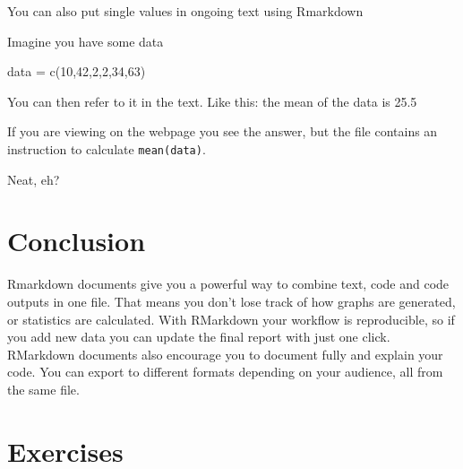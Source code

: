 \documentclass[
]{book}
\newenvironment{Shaded}{\begin{snugshade}}{\end{snugshade}}
\newcommand{\DecValTok}[1]{\textcolor[rgb]{0.00,0.00,0.81}{#1}}
\newcommand{\FunctionTok}[1]{\textcolor[rgb]{0.00,0.00,0.00}{#1}}
\newcommand{\NormalTok}[1]{#1}
\newcommand{\OtherTok}[1]{\textcolor[rgb]{0.56,0.35,0.01}{#1}}
\begin{document}
You can also put single values in ongoing text using Rmarkdown

Imagine you have some data

\begin{Shaded}
\begin{Highlighting}[]
\NormalTok{data }\OtherTok{=} \FunctionTok{c}\NormalTok{(}\DecValTok{10}\NormalTok{,}\DecValTok{42}\NormalTok{,}\DecValTok{2}\NormalTok{,}\DecValTok{2}\NormalTok{,}\DecValTok{34}\NormalTok{,}\DecValTok{63}\NormalTok{)}
\end{Highlighting}
\end{Shaded}

You can then refer to it in the text. Like this: the mean of the data is 25.5

If you are viewing on the webpage you see the answer, but the file contains an instruction to calculate \texttt{mean(data)}.

Neat, eh?

\hypertarget{conclusion}{%
\section{Conclusion}\label{conclusion}}

Rmarkdown documents give you a powerful way to combine text, code and code outputs in one file. That means you don't lose track of how graphs are generated, or statistics are calculated. With RMarkdown your workflow is reproducible, so if you add new data you can update the final report with just one click. RMarkdown documents also encourage you to document fully and explain your code. You can export to different formats depending on your audience, all from the same file.

\hypertarget{exercises-3}{%
\section{Exercises}\label{exercises-3}}
\end{document}
